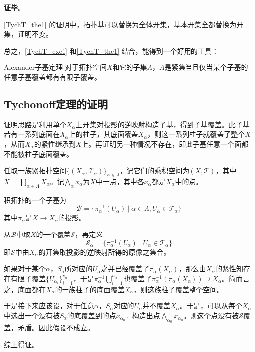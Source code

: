 \textbf{证毕}。



\autoref{TychT_the1} 的证明中，拓扑基可以替换为全体开集，基本开集全都替换为开集，证明不变。

总之，\autoref{TychT_exe1} 和\autoref{TychT_the1} 结合，能得到一个好用的工具：

\begin{corollary}{Alexander子基定理}
对于拓扑空间$X$和它的子集$A$，$A$是紧集当且仅当某个子基的任意子基覆盖都有有限子覆盖。
\end{corollary}




\subsection{Tychonoff定理的证明}

证明思路是利用单个$X_\alpha$上开集对投影的逆映射构造子基，得到子基覆盖。此子基若有一系列底面在$X_\alpha$上的柱子，其底面覆盖$X_\alpha$，则这一系列柱子就覆盖了整个$X$，从而$X_\alpha$的紧性继承到$X$上。再证明另一种情况不存在，即此子基任意一个面都不能被柱子底面覆盖。

任取一族紧拓扑空间$\{(X_\alpha, \mathcal{T}_\alpha)\}_{\alpha\in \Lambda}$，记它们的乘积空间为$(X, \mathcal{T})$，其中$X=\prod_{\alpha\in\Lambda}X_\alpha$。记$\bigwedge_\alpha x_\alpha$为$X$中一点，其中各$x_\alpha$都是$X_\alpha$中的点。

积拓扑的一个子基为
\begin{equation}
\mathcal{B} = \{\pi_\alpha^{-1}(U_\alpha)\mid \alpha\in\Lambda, U_\alpha\in \mathcal{T}_\alpha\}
\end{equation}
其中$\pi_\alpha$是$X\to X_\alpha$的投影。

从$\mathcal{B}$中取$X$的一个覆盖$\mathcal{S}$，再定义
\begin{equation}
\mathcal{S}_\alpha = \{\pi_\alpha^{-1}(U_\alpha)\mid U_\alpha\in \mathcal{T}_\alpha\}
\end{equation}
即$\mathcal{S}$中由$X_\alpha$的开集取投影的逆映射所得的原像之集合。

如果对于某个$\alpha$，$S_\alpha$所对应的$U_\alpha$之并已经覆盖了$\pi_\alpha(X_\alpha)$，那么由$X_\alpha$的紧性知存在有限子覆盖$\{U_{\alpha_i}\}_{i=1}^{n_\alpha}$，于是$\pi_\alpha^{-1}\bigcup_{i=1}^{n_\alpha}$也覆盖了$\pi_\alpha^{-1}(\pi_\alpha(X_\alpha))\supseteq X_\alpha$。简而言之，底面都在$X_\alpha$的一族柱子的底面覆盖$X_\alpha$，则这族柱子覆盖整个空间。

于是接下来应该设，对于任意$\alpha$，$S_\alpha$对应的$U_\alpha$并不覆盖$X_\alpha$。于是，可以从每个$X_\alpha$中选出一个没有被$S_\alpha$的底覆盖到的点$x_{\alpha_0}$，构造出点$\bigwedge_{\alpha_0}x_{\alpha_0}$。则这个点没有被$\mathcal{S}$覆盖，矛盾。因此假设不成立。

综上得证。

















